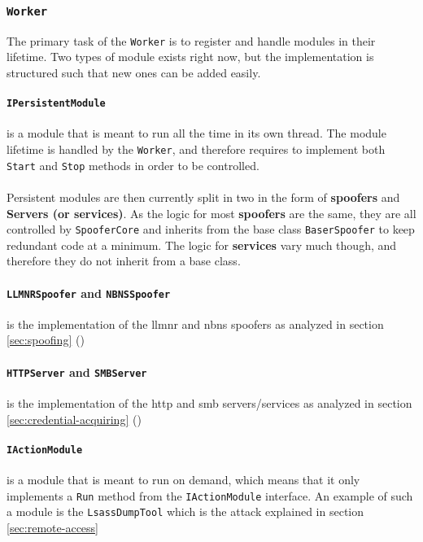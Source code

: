 \documentclass{article}
\begin{document}

\subsubsection{\texttt{Worker}}
The primary task of the \texttt{Worker} is to register and handle modules in their lifetime. Two types of module exists right now, but the implementation is structured such that new ones can be added easily.

\paragraph{\texttt{IPersistentModule}} is a module that is meant to run all the time in its own thread. The module lifetime is handled by the \texttt{Worker}, and therefore requires to implement both \texttt{Start} and \texttt{Stop} methods in order to be controlled.
\\\\
Persistent modules are then currently split in two in the form of \textbf{spoofers} and \textbf{Servers (or services)}. As the logic for most \textbf{spoofers} are the same, they are all controlled by \texttt{SpooferCore} and inherits from the base class \texttt{BaserSpoofer} to keep redundant code at a minimum. The logic for \textbf{services} vary much though, and therefore they do not inherit from a base class.

\paragraph{\texttt{LLMNRSpoofer} and \texttt{NBNSSpoofer}} is the implementation of the \gls{llmnr} and \gls{nbns} spoofers as analyzed in section \ref{sec:spoofing} ()

\paragraph{\texttt{HTTPServer} and \texttt{SMBServer}} is the implementation of the \gls{http} and \gls{smb} servers/services as analyzed in section \ref{sec:credential-acquiring} ()

\paragraph{\texttt{IActionModule}} is a module that is meant to run on demand, which means that it only implements a \texttt{Run} method from the \texttt{IActionModule} interface. An example of such a module is the \texttt{LsassDumpTool} which is the attack explained in section \ref{sec:remote-access}
\end{document}
